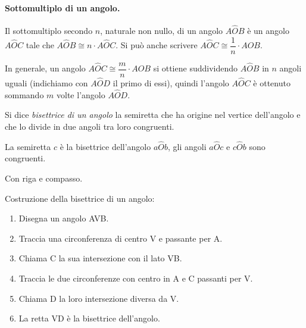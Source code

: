 \paragraph{Sottomultiplo di un angolo.} Il sottomultiplo secondo \(n\), 
naturale non nullo, di un angolo \(A\widehat{O}B\) è un angolo 
\(A\widehat{O}C\) tale che \(A\widehat{O}B \cong n\cdot A\widehat{O}C\). 
Si può anche scrivere \(A\widehat{O}C\cong \dfrac{1}{n}\cdot 
A\widehat{O}B\).

In generale, un angolo \(A\widehat{O}C\cong\dfrac{m}{n}\cdot 
A\widehat{O}B\) si ottiene suddividendo \(A\widehat{O}B\) in \(n\) angoli 
uguali (indichiamo con \(A\widehat{O}D\) il primo di essi), quindi 
l'angolo \(A\widehat{O}C\) è ottenuto sommando \(m\) volte l'angolo 
\(A\widehat{O}D\).

 \begin{definizione}
Si dice \emph{bisettrice di un angolo} la semiretta che ha origine 
nel vertice dell'angolo e che lo divide in due angoli tra loro 
congruenti.

\end{definizione}
\begin{multicols}{2}
 
La semiretta \(c\) è la bisettrice dell'angolo 
\(a\widehat{O}b\), gli angoli \(a\widehat{O}c\) e \(c\widehat{O}b\) sono 
congruenti.
 \begin{inaccessibleblock}
\begin{center}\end{center}
\end{inaccessibleblock}
\end{multicols}

Con riga e compasso.

\begin{procedura}[Bisettrice]\label{proc:fonda_bisettrice}
  Costruzione della bisettrice di un angolo:
  \begin{enumerate} [nosep]
    \item 
    Disegna un angolo AVB.
    \item 
    Traccia una circonferenza di centro V e passante per A. 
    \item
    Chiama C la sua intersezione con il lato VB.
    \item 
    Traccia le due circonferenze con centro in A e C passanti per V.
    \item 
    Chiama D la loro intersezione diversa da V.    
    \item
    La retta VD è la bisettrice dell'angolo.
  \end{enumerate}
\end{procedura}

